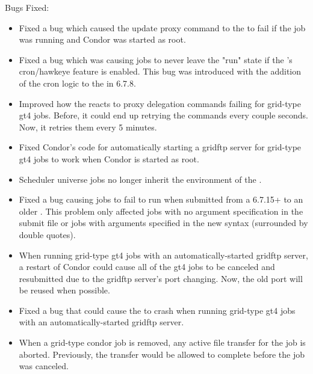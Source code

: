 \noindent Bugs Fixed:

\begin{itemize}

\item Fixed a bug which caused the update proxy command to the
 to fail if the job was running and Condor was started
as root.

\item Fixed a bug which was causing jobs to never leave the "run"
state if the 's cron/hawkeye feature is enabled.  This
bug was introduced with the addition of the cron logic to the
 in 6.7.8.

\item Improved how the  reacts to proxy delegation
commands failing for grid-type gt4 jobs. Before, it could end up retrying
the commands every couple seconds. Now, it retries them every 5 minutes.

\item Fixed Condor's code for automatically starting a gridftp server for
grid-type gt4 jobs to work when Condor is started as root.

\item Scheduler universe jobs no longer inherit the environment of the
.

\item Fixed a bug causing jobs to fail to run when submitted from a
6.7.15+  to an older .  This problem
only affected jobs with no argument specification in the submit file
or jobs with arguments specified in the new syntax (surrounded by
double quotes).

\item When running grid-type gt4 jobs with an automatically-started
gridftp server, a restart of Condor could cause all of the gt4 jobs to
be canceled and resubmitted due to the gridftp server's port changing.
Now, the old port will be reused when possible.

\item Fixed a bug that could cause the  to crash
when running grid-type gt4 jobs with an automatically-started gridftp
server.

\item When a grid-type condor job is removed, any active file transfer
for the job is aborted. Previously, the transfer would be allowed to
complete before the job was canceled.

\end{itemize}

